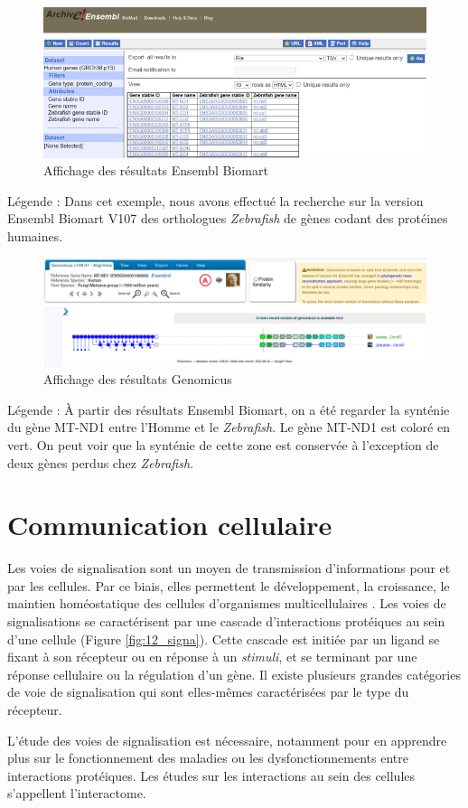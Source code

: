 \begin{figure}[H]
    \centering
    \includegraphics[width=1\textwidth]{figures/corps/figure10.png}
    \caption{Affichage des résultats Ensembl Biomart}
    \label{fig:10_biomart}
\end{figure}
Légende : Dans cet exemple, nous avons effectué la recherche sur la version Ensembl Biomart V107 des orthologues \textit{Zebrafish} de gènes codant des protéines humaines.  \\
\begin{figure}[H]
    \centering
    \includegraphics[width=1\textwidth]{figures/corps/figure11.png}
    \caption{Affichage des résultats Genomicus}
    \label{fig:11_genomicus}
\end{figure}
Légende : À partir des résultats Ensembl Biomart, on a été regarder la synténie du gène MT-ND1 entre l’Homme et le \textit{Zebrafish}. Le gène MT-ND1 est coloré en vert. On peut voir que la synténie de cette zone est conservée à l’exception de deux gènes perdus chez \textit{Zebrafish}.

\newpage
\section{Communication cellulaire} \label{commcel}
\par Les voies de signalisation sont un moyen de transmission d’informations pour et par les cellules. Par ce biais, elles permettent le développement, la croissance, le maintien homéostatique des cellules d’organismes multicellulaires \parencite{combarnous_communications_2013}. Les voies de signalisations se caractérisent par une cascade d’interactions protéiques au sein d’une cellule (Figure \ref{fig:12_signa}). Cette cascade est initiée par un ligand se fixant à son récepteur ou en réponse à un \textit{stimuli}, et se terminant par une réponse cellulaire ou la régulation d’un gène. Il existe plusieurs grandes catégories de voie de signalisation qui sont elles-mêmes caractérisées par le type du récepteur. 
\par L’étude des voies de signalisation est nécessaire, notamment pour en apprendre plus sur le fonctionnement des maladies ou les dysfonctionnements entre interactions protéiques. Les études sur les interactions au sein des cellules s’appellent l’interactome. 

